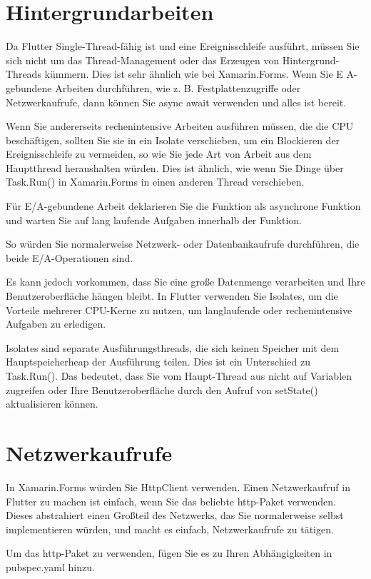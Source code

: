 \section{Hintergrundarbeiten}
Da Flutter Single-Thread-fähig ist und eine Ereignisschleife ausführt, müssen Sie sich nicht um das Thread-Management oder das Erzeugen von Hintergrund-Threads kümmern. Dies ist sehr ähnlich wie bei Xamarin.Forms. Wenn Sie E A-gebundene Arbeiten durchführen, wie z. B. Festplattenzugriffe oder Netzwerkaufrufe, dann können Sie async await verwenden und alles ist bereit.

Wenn Sie andererseits rechenintensive Arbeiten ausführen müssen, die die CPU beschäftigen, sollten Sie sie in ein Isolate verschieben, um ein Blockieren der Ereignisschleife zu vermeiden, so wie Sie jede Art von Arbeit aus dem Hauptthread heraushalten würden. Dies ist ähnlich, wie wenn Sie Dinge über Task.Run() in Xamarin.Forms in einen anderen Thread verschieben.

Für E/A-gebundene Arbeit deklarieren Sie die Funktion als asynchrone Funktion und warten Sie auf lang laufende Aufgaben innerhalb der Funktion.

So würden Sie normalerweise Netzwerk- oder Datenbankaufrufe durchführen, die beide E/A-Operationen sind.

Es kann jedoch vorkommen, dass Sie eine große Datenmenge verarbeiten und Ihre Benutzeroberfläche hängen bleibt. In Flutter verwenden Sie Isolates, um die Vorteile mehrerer CPU-Kerne zu nutzen, um langlaufende oder rechenintensive Aufgaben zu erledigen.

Isolates sind separate Ausführungsthreads, die sich keinen Speicher mit dem Hauptspeicherheap der Ausführung teilen. Dies ist ein Unterschied zu Task.Run(). Das bedeutet, dass Sie vom Haupt-Thread aus nicht auf Variablen zugreifen oder Ihre Benutzeroberfläche durch den Aufruf von setState() aktualisieren können.
\section{Netzwerkaufrufe}
In Xamarin.Forms würden Sie HttpClient verwenden. Einen Netzwerkaufruf in Flutter zu machen ist einfach, wenn Sie das beliebte http-Paket verwenden. Dieses abstrahiert einen Großteil des Netzwerks, das Sie normalerweise selbst implementieren würden, und macht es einfach, Netzwerkaufrufe zu tätigen.

Um das http-Paket zu verwenden, fügen Sie es zu Ihren Abhängigkeiten in pubspec.yaml hinzu.

